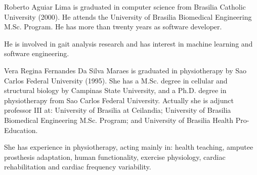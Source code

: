 \documentclass[journal]{IEEEtran}
\begin{document}


% 

\begin{IEEEbiography}{Roberto Aguiar Lima}
	is graduated in computer science from Brasilia Catholic University (2000).
	He attends the University of Brasilia Biomedical Engineering M.Sc. Program.
	He has more than twenty years as software developer.

	He is involved in gait analysis research and has interest in machine learning and software engineering.
\end{IEEEbiography}

\begin{IEEEbiography}{Vera Regina Fernandes Da Silva Maraes}
	is graduated in physiotherapy by Sao Carlos Federal University (1995). She has a M.Sc. degree in 
	cellular and structural biology by Campinas State University, and a Ph.D. degree in physiotherapy
	from Sao Carlos Federal University. 
	Actually she is  adjunct professor III at: University of Brasilia at Ceilandia; 
	University of Brasilia Biomedical Engineering M.Sc. Program;
	and University of Brasilia Health Pro-Education.

	She has experience in physiotherapy, acting mainly in: health teaching, amputee prosthesis adaptation,
	human functionality, exercise physiology, cardiac rehabilitation and cardiac frequency variability.
\end{IEEEbiography}
\end{document}
